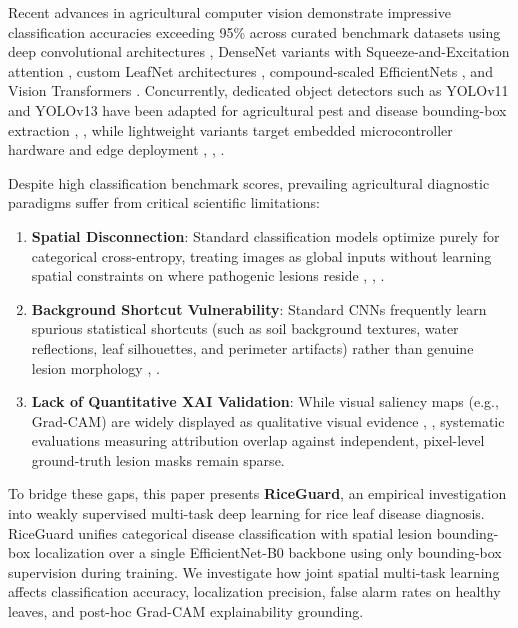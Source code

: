 \documentclass[conference]{IEEEtran}
\begin{document}
Recent advances in agricultural computer vision demonstrate impressive classification accuracies exceeding 95\% across curated benchmark datasets using deep convolutional architectures \cite{ref19}, DenseNet variants with Squeeze-and-Excitation attention \cite{ref2}, custom LeafNet architectures \cite{ref17}, compound-scaled EfficientNets \cite{ref15}, and Vision Transformers \cite{ref6}. Concurrently, dedicated object detectors such as YOLOv11 and YOLOv13 have been adapted for agricultural pest and disease bounding-box extraction \cite{ref1}, \cite{ref12}, while lightweight variants target embedded microcontroller hardware and edge deployment \cite{ref3}, \cite{ref9}, \cite{ref14}.

Despite high classification benchmark scores, prevailing agricultural diagnostic paradigms suffer from critical scientific limitations:
\begin{enumerate}
    \item \textbf{Spatial Disconnection}: Standard classification models optimize purely for categorical cross-entropy, treating images as global inputs without learning spatial constraints on where pathogenic lesions reside \cite{ref4}, \cite{ref5}, \cite{ref7}.
    \item \textbf{Background Shortcut Vulnerability}: Standard CNNs frequently learn spurious statistical shortcuts (such as soil background textures, water reflections, leaf silhouettes, and perimeter artifacts) rather than genuine lesion morphology \cite{ref6}, \cite{ref8}.
    \item \textbf{Lack of Quantitative XAI Validation}: While visual saliency maps (e.g., Grad-CAM) are widely displayed as qualitative visual evidence \cite{ref4}, \cite{ref7}, systematic evaluations measuring attribution overlap against independent, pixel-level ground-truth lesion masks remain sparse.
\end{enumerate}

To bridge these gaps, this paper presents \textbf{RiceGuard}, an empirical investigation into weakly supervised multi-task deep learning for rice leaf disease diagnosis. RiceGuard unifies categorical disease classification with spatial lesion bounding-box localization over a single EfficientNet-B0 backbone using only bounding-box supervision during training. We investigate how joint spatial multi-task learning affects classification accuracy, localization precision, false alarm rates on healthy leaves, and post-hoc Grad-CAM explainability grounding.
\end{document}
